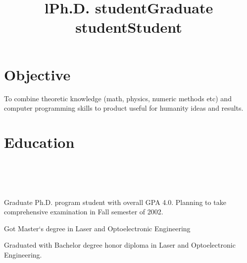 \documentclass[10pt,overlapped,line]{res}
\begin{document}
\address{ 
  \textbf{Preferred Mailing Address:}\newline 
  Computer Science Dept., FEC \\ 
  UNM, Albuquerque NM, 87131 \\  
  USA \newline
}  
\address{
   \textbf{Current Address}: Ortiz SE.  Apt.13 \\
   Albuquerque NM, 87108 \\
   USA
}
\address{  
  \href{URL}{email:yoh@cs.unm.edu}\\ 
  \href{URL}{http://www.cs.unm.edu/~yoh}\\
  \texttt{(505) 266-5958 (home)}
} 
 
\begin{resume}


\section{Objective} 
   To combine theoretic knowledge (math, physics, numeric methods etc)
   and computer programming skills to product useful for humanity
   ideas and results.

\section{Education}
\begin{format}
  \title{l}\\
  \\
  \body\\
\end{format}

\title{Ph.D. student}
\begin{position}
  Graduate Ph.D. program student with overall GPA 4.0. Planning to
take comprehensive examination in Fall semester of 2002.
\end{position}

\title{Graduate student}
\begin{position}
 Got Master`s degree in Laser and Optoelectronic Engineering
\end{position}

\title{Student}
\begin{position}
 Graduated with Bachelor degree honor diploma in Laser and Optoelectronic Engineering.
\end{position}


\end{resume}
\end{document}
